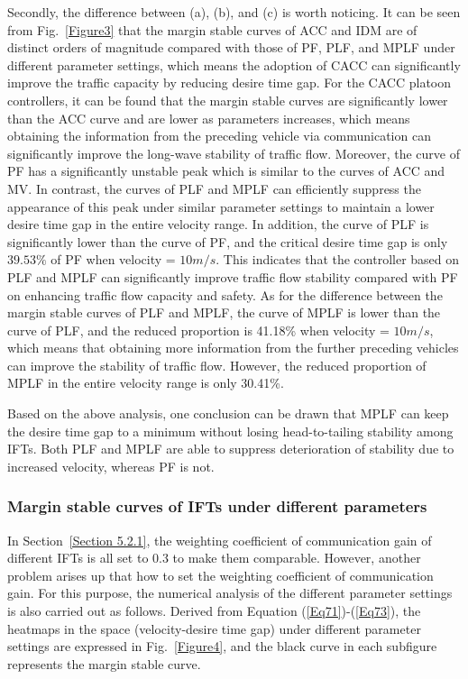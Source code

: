 \documentclass[journal]{IEEEtran}
\begin{document}
Secondly, the difference between (a), (b), and (c) is worth noticing. It can be seen from Fig.~\ref{Figure3} that the margin stable curves of ACC and IDM are of distinct orders of magnitude compared with those of PF, PLF, and MPLF under different parameter settings, which means the adoption of CACC can significantly improve the traffic capacity by reducing desire time gap. For the CACC platoon controllers, it can be found that the margin stable curves are significantly lower than the ACC curve and are lower as parameters increases, which means obtaining the information from the preceding vehicle via communication can significantly improve the long-wave stability of traffic flow. Moreover, the curve of PF has a significantly unstable peak which is similar to the curves of ACC and MV. In contrast, the curves of PLF and MPLF can efficiently suppress the appearance of this peak under similar parameter settings to maintain a lower desire time gap in the entire velocity range. In addition, the curve of PLF is significantly lower than the curve of PF, and the critical desire time gap is only $39.53\%$ of PF when velocity = $10m/s$. This indicates that the controller based on PLF and MPLF can significantly improve traffic flow stability compared with PF on enhancing traffic flow capacity and safety. As for the difference between the margin stable curves of PLF and MPLF, the curve of MPLF is lower than the curve of PLF, and the reduced proportion is 41.18\% when velocity = $10m/s$, which means that obtaining more information from the further preceding vehicles can improve the stability of traffic flow. However, the reduced proportion of MPLF in the entire velocity range is only 30.41\%. 

Based on the above analysis, one conclusion can be drawn that MPLF can keep the desire time gap to a minimum without losing head-to-tailing stability among IFTs. Both PLF and MPLF are able to suppress deterioration of stability due to increased velocity, whereas PF is not.



\subsubsection{Margin stable curves of IFTs under different parameters}
\label{Section 5.2.2}
In Section~\ref{Section 5.2.1}, the weighting coefficient of communication gain of different IFTs is all set to 0.3 to make them comparable. However, another problem arises up that how to set the weighting coefficient of communication gain. For this purpose, the numerical analysis of the different parameter settings is also carried out as follows. Derived from Equation (\ref{Eq71})-(\ref{Eq73}), the heatmaps in the space (velocity-desire time gap) under different parameter settings are expressed in Fig.~\ref{Figure4}, and the black curve in each subfigure represents the margin stable curve.
\end{document}
